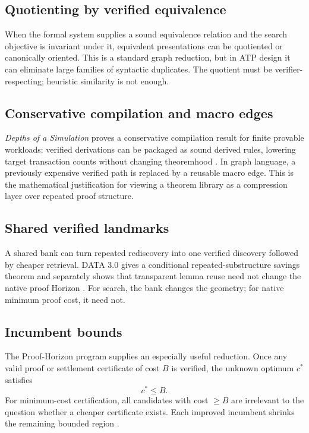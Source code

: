 \subsection{Quotienting by verified equivalence}
When the formal system supplies a sound equivalence relation and the search objective is invariant under it, equivalent presentations can be quotiented or canonically oriented. This is a standard graph reduction, but in ATP design it can eliminate large families of syntactic duplicates. The quotient must be verifier-respecting; heuristic similarity is not enough.

\subsection{Conservative compilation and macro edges}
\emph{Depths of a Simulation} proves a conservative compilation result for finite provable workloads: verified derivations can be packaged as sound derived rules, lowering target transaction counts without changing theoremhood \cite{depths}. In graph language, a previously expensive verified path is replaced by a reusable macro edge. This is the mathematical justification for viewing a theorem library as a compression layer over repeated proof structure.

\subsection{Shared verified landmarks}
A shared bank can turn repeated rediscovery into one verified discovery followed by cheaper retrieval. DATA 3.0 gives a conditional repeated-substructure savings theorem and separately shows that transparent lemma reuse need not change the native proof Horizon \cite{data3}. For search, the bank changes the geometry; for native minimum proof cost, it need not.

\subsection{Incumbent bounds}
The Proof-Horizon program supplies an especially useful reduction. Once any valid proof or settlement certificate of cost $B$ is verified, the unknown optimum $c^*$ satisfies
\[
c^*\le B.
\]
For minimum-cost certification, all candidates with cost $\ge B$ are irrelevant to the question whether a cheaper certificate exists. Each improved incumbent shrinks the remaining bounded region \cite{horizon,data201}.

